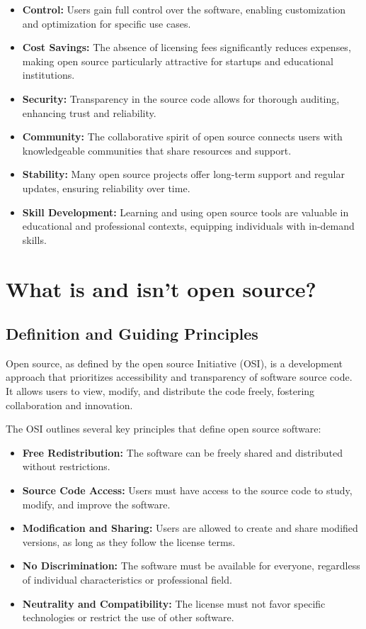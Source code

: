 \begin{itemize}
    \item \textbf{Control:} Users gain full control over the software, enabling customization and optimization for specific use cases.
    \item \textbf{Cost Savings:} The absence of licensing fees significantly reduces expenses, making open source particularly attractive for startups and educational institutions.
    \item \textbf{Security:} Transparency in the source code allows for thorough auditing, enhancing trust and reliability.
    \item \textbf{Community:} The collaborative spirit of open source connects users with knowledgeable communities that share resources and support.
    \item \textbf{Stability:} Many open source projects offer long-term support and regular updates, ensuring reliability over time.
    \item \textbf{Skill Development:} Learning and using open source tools are valuable in educational and professional contexts, equipping individuals with in-demand skills.
\end{itemize}


\section{What is and isn’t open source?}

\subsection{Definition and Guiding Principles}

Open source, as defined by the open source Initiative (OSI), is a development approach that prioritizes accessibility and transparency of software source code. It allows users to view, modify, and distribute the code freely, fostering collaboration and innovation. 

The OSI outlines several key principles that define open source software:

\begin{itemize}
    \item \textbf{Free Redistribution:} The software can be freely shared and distributed without restrictions.
    \item \textbf{Source Code Access:} Users must have access to the source code to study, modify, and improve the software.
    \item \textbf{Modification and Sharing:} Users are allowed to create and share modified versions, as long as they follow the license terms.
    \item \textbf{No Discrimination:} The software must be available for everyone, regardless of individual characteristics or professional field.
    \item \textbf{Neutrality and Compatibility:} The license must not favor specific technologies or restrict the use of other software.
\end{itemize}

